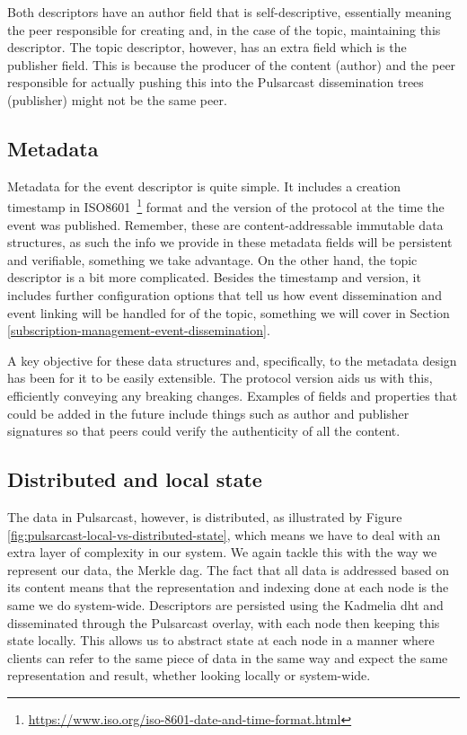 Both descriptors have an author field that is self-descriptive, essentially
meaning the peer responsible for creating and, in the case of the topic,
maintaining this descriptor. The topic descriptor, however, has an extra field
which is the publisher field. This is because the producer of the content
(author) and the peer responsible for actually pushing this into the Pulsarcast
dissemination trees (publisher) might not be the same peer.

\subsection{Metadata}\label{subsec:metadata}

Metadata for the event descriptor is quite simple. It includes a creation
timestamp in
ISO8601~\footnote{\url{https://www.iso.org/iso-8601-date-and-time-format.html}}
format and the version of the protocol at the time the event was published.
Remember, these are content-addressable immutable data structures, as such the
info we provide in these metadata fields will be persistent and verifiable,
something we take advantage. On the other hand, the topic descriptor is a bit
more complicated. Besides the timestamp and version, it includes further
configuration options that tell us how event dissemination and event linking
will be handled for of the topic, something we will cover in Section
\ref{subscription-management-event-dissemination}.

A key objective for these data structures and, specifically, to the metadata
design has been for it to be easily extensible. The protocol version aids us
with this, efficiently conveying any breaking changes. Examples of fields and
properties that could be added in the future include things such as author and
publisher signatures so that peers could verify the authenticity of all the
content.

\subsection{Distributed and local state}\label{subsec:distributed-and-local-state}

The data in Pulsarcast, however, is distributed, as illustrated by Figure
\ref{fig:pulsarcast-local-vs-distributed-state}, which means we have to deal
with an extra layer of complexity in our system. We again tackle this with the
way we represent our data, the Merkle \acrshort{dag}. The fact that all data is addressed
based on its content means that the representation and indexing done at each
node is the same we do system-wide. Descriptors are persisted using the
Kadmelia \acrshort{dht} and disseminated through the Pulsarcast overlay, with each node
then keeping this state locally. This allows us to abstract state at each node
in a manner where clients can refer to the same piece of data in the same way
and expect the same representation and result, whether looking locally or
system-wide.

